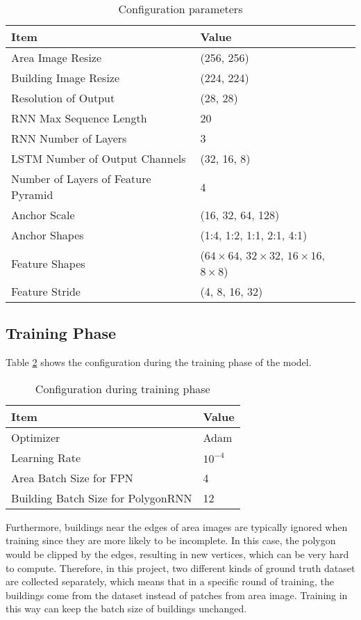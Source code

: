 \begin{table}[!h]
	\centering
	\caption[Configuration parameters.]{Configuration parameters}
	\label{tab:configpara}
	\begin{tabular}{l|l}
	\hline
	Item & Value \\
	\hline
	Area Image Resize & (256, 256) \\
	Building Image Resize & (224, 224) \\
	Resolution of Output & (28, 28) \\
	\hline
	RNN Max Sequence Length & 20 \\
	RNN Number of Layers & 3 \\
	LSTM Number of Output Channels & (32, 16, 8) \\
	\hline
	Number of Layers of Feature Pyramid & 4 \\
	Anchor Scale & (16, 32, 64, 128) \\
	Anchor Shapes & (1:4, 1:2, 1:1, 2:1, 4:1) \\
	Feature Shapes & ($64\times64$, $32\times32$, $16\times16$, $8\times8$) \\
	Feature Stride & (4, 8, 16, 32) \\
	\hline
	\end{tabular}
\end{table}

\subsection{Training Phase}\label{trnphs}

Table \ref{tab:trnphs} shows the configuration during the training phase of the model.

\begin{table}[!h]
	\centering
	\caption[Configuration during training phase.]{Configuration during training phase}
	\label{tab:trnphs}
	\begin{tabular}{l|l}
	\hline
	Item & Value \\
	\hline
	Optimizer & Adam \\
	Learning Rate & $10^{-4}$ \\
	Area Batch Size for FPN & 4 \\
	Building Batch Size for PolygonRNN & 12 \\
	\hline
	\end{tabular}
\end{table}

Furthermore, buildings near the edges of area images are typically ignored when training since they are more likely to be incomplete. In this case, the polygon would be clipped by the edges, resulting in new vertices, which can be very hard to compute. Therefore, in this project, two different kinds of ground truth dataset are collected separately, which means that in a specific round of training, the buildings come from the dataset instead of patches from area image.  Training in this way can keep the batch size of buildings unchanged.

